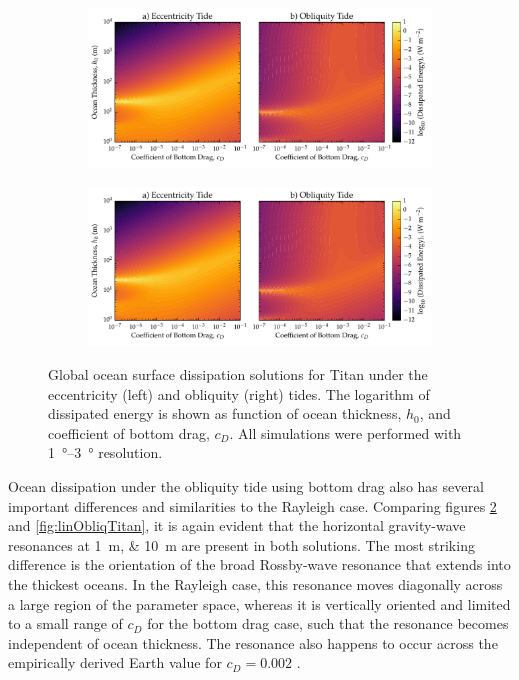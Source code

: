 \begin{figure}[!b]
    \centering
    \begin{subfigure}[t]{0.95\linewidth} %
        \includegraphics[width=\linewidth]{Figures/titan_bottom}
        \label{fig:botEccTitan}
    \end{subfigure}
    \begin{subfigure}[t]{0\linewidth} %
         \includegraphics[width=\linewidth]{Figures/titan_bottom}
         \label{fig:botObliqTitan}   
    \end{subfigure}
    \vspace{-0.5cm}
\caption{Global ocean surface dissipation solutions for Titan under the eccentricity (left) and obliquity (right) tides. The logarithm of dissipated energy is shown as function of ocean thickness, $h_0$, and coefficient of bottom drag, $c_D$. All simulations were performed with \SIrange{1}{3}{\degree} resolution. \label{fig:botTitan}}
\end{figure}


Ocean dissipation under the obliquity tide using bottom drag also has several important differences and similarities to the Rayleigh case. Comparing figures \ref{fig:botObliqTitan} and \ref{fig:linObliqTitan}, it is again evident that the horizontal gravity-wave resonances at \SIlist{1;10}{\metre} are present in both solutions. The most striking difference is the orientation of the broad Rossby-wave resonance that extends into the thickest oceans. In the Rayleigh case, this resonance moves diagonally across a large region of the parameter space, whereas it is vertically oriented and limited to a small range of $c_D$ for the bottom drag case, such that the resonance becomes independent of ocean thickness. The resonance also happens to occur across the empirically derived Earth value for $c_D = 0.002$ \citep[e.g.,][]{sohl1995tidal,egbert2001estimates}. 

